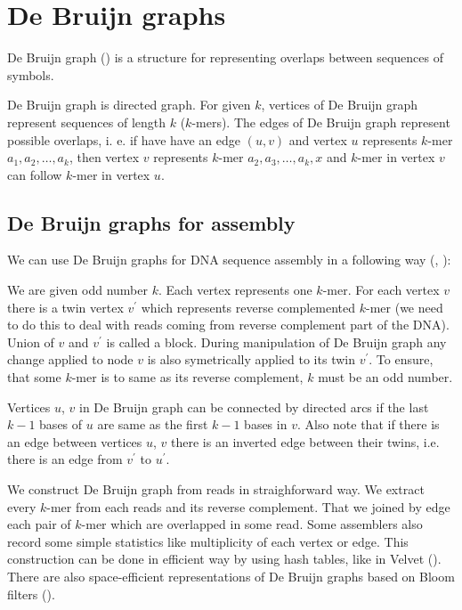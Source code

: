 \chapter{De Bruijn graphs}

De Bruijn graph (\cite{de1946combinatorial}) is a structure for representing
overlaps between sequences of symbols.

De Bruijn graph is directed graph. 
For given $k$, vertices of De Bruijn graph represent sequences of length $k$
($k$-mers). The edges of De Bruijn graph represent possible overlaps, i. e. 
if have have an edge $(u, v)$ and vertex $u$ represents $k$-mer $a_1, a_2, \dots, a_k$, then
vertex $v$ represents $k$-mer $a_2, a_3, \dots, a_k, x$ and $k$-mer in vertex $v$ can
follow $k$-mer in vertex $u$.

\section{De Bruijn graphs for assembly}

We can use De Bruijn graphs for DNA sequence assembly in a following way
(\cite{pevzner2001eulerian}, \cite{Velvet}):

We are given odd number $k$.
Each vertex represents one $k$-mer. For each vertex $v$ there is a twin vertex $v^{'}$ which
represents reverse complemented $k$-mer (we need to do this to deal with reads
coming from reverse complement part of the DNA). Union of $v$ and $v^{'}$ is called a block.
During manipulation of De Bruijn graph any change applied to node $v$ is also symetrically
applied to its twin $v^{'}$. To ensure, that some $k$-mer is to same as its reverse complement,
$k$ must be an odd number.

Vertices $u$, $v$ in De Bruijn graph can be connected by directed arcs if the last
$k-1$ bases of $u$ are same as the first $k-1$ bases in $v$. Also note that
if there is an edge between vertices $u$, $v$ there is an inverted edge between their twins,
i.e. there is an edge from $v^{'}$ to $u^{'}$.

We construct De Bruijn graph from reads in straighforward way.
We extract every $k$-mer from each reads and its reverse complement.
That we joined by edge each pair of $k$-mer which are overlapped in some read.
Some assemblers also record some simple statistics like multiplicity of each vertex or edge. 
This construction can be done in efficient way by using hash tables, like in Velvet (\cite{Veltet}).
There are also space-efficient representations of De Bruijn graphs based on Bloom filters (\cite{minia}).

